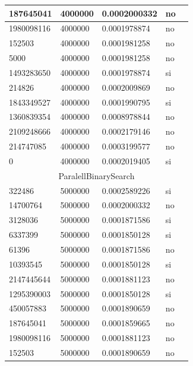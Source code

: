 \documentclass[12pt, fleqn]{article}                             %
\theoremstyle{break}                                            %
\begin{document}
\begin{longtable}{|m{5em}|m{5em}|m{10em}|m{5em}|@{}m{0pt}@{}}
            187645041& 4000000  & 0.0002000332 & no &\\[1em]    \hline
            1980098116& 4000000  & 0.0001978874 & no &\\[1em]    \hline
            152503& 4000000  & 0.0001981258 & no &\\[1em]    \hline
            5000& 4000000  & 0.0001981258 & no &\\[1em]    \hline
            1493283650& 4000000  & 0.0001978874 & si &\\[1em]    \hline
            214826& 4000000  & 0.0002009869 & no &\\[1em]    \hline
            1843349527& 4000000  & 0.0001990795 & si &\\[1em]    \hline
            1360839354& 4000000  & 0.0008978844 & no &\\[1em]    \hline
            2109248666& 4000000  & 0.0002179146 & no &\\[1em]    \hline
            214747085& 4000000  & 0.0003199577 & no &\\[1em]    \hline
            0& 4000000  & 0.0002019405 & si &\\[1em]    \hline
            \multicolumn{5}{|c|}{ParalellBinarySearch}   \\          \hline
            322486& 5000000  & 0.0002589226 & si &\\[1em]    \hline
            14700764& 5000000  & 0.0002000332 & no &\\[1em]    \hline
            3128036& 5000000  & 0.0001871586 & si &\\[1em]    \hline
            6337399& 5000000  & 0.0001850128 & si &\\[1em]    \hline
            61396& 5000000  & 0.0001871586 & no &\\[1em]    \hline
            10393545& 5000000  & 0.0001850128 & si &\\[1em]    \hline
            2147445644& 5000000  & 0.0001881123 & no &\\[1em]    \hline
            1295390003& 5000000  & 0.0001850128 & si &\\[1em]    \hline
            450057883& 5000000  & 0.0001890659 & no &\\[1em]    \hline
            187645041& 5000000  & 0.0001859665 & no &\\[1em]    \hline
            1980098116& 5000000  & 0.0001881123 & no &\\[1em]    \hline
            152503& 5000000  & 0.0001890659 & no &\\[1em]    \hline

\end{longtable}
\end{document}
